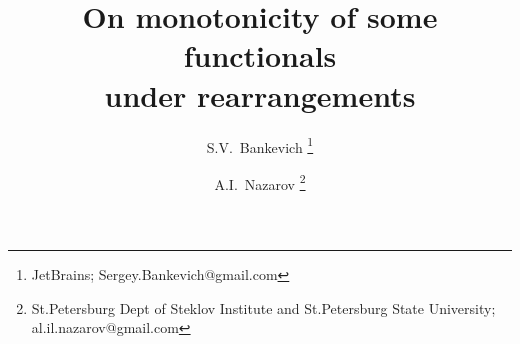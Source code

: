 \documentclass[12pt]{article}
\begin{document}
\title{On monotonicity of some functionals \\ under rearrangements}
\author{
S.V.~Bankevich
\footnote{JetBrains; Sergey.Bankevich@gmail.com}
\and
A.I.~Nazarov
\footnote{St.Petersburg Dept of Steklov Institute and St.Petersburg State University; al.il.nazarov@gmail.com}
}

\maketitle
























\end{document}
